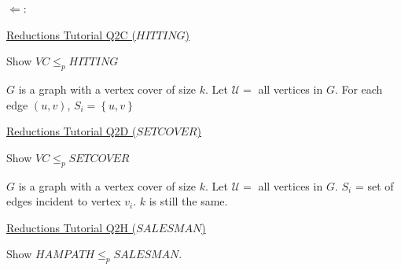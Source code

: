 \documentclass[10pt,landscape,a4paper]{article}
\newcommand{\set}[1]{\left \{ #1 \right \}}
\begin{document}
\begin{multicols*}{3}
$\Leftarrow$: %

\underline{Reductions Tutorial Q2C ($HITTING$)}

Show $VC \leq_p HITTING$

$G$ is a graph with a vertex cover of size $k$. Let $\mathcal{U} =$ all vertices in $G$. For each edge $(u, v)$, $S_i = \set{u, v}$


\underline{Reductions Tutorial Q2D ($SETCOVER$)}

Show $VC \leq_p SETCOVER$

$G$ is a graph with a vertex cover of size $k$. Let $\mathcal{U} =$ all vertices in $G$. $S_i$ = set of edges incident to vertex $v_i$. $k$ is still the same.

\underline{Reductions Tutorial Q2H ($SALESMAN$)}

Show $HAMPATH \leq_p SALESMAN$.


\end{multicols*}
\end{document}
